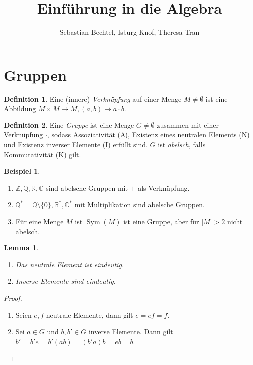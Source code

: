 \documentclass[12pt]{scrartcl} %
\DeclareMathOperator{\sym}{Sym}
\newtheorem{lemma}[thm]{Lemma}
\theoremstyle{definition}
\newtheorem*{defn}{Definition}
\newtheorem{ex}{Beispiel}
\theoremstyle{remark}
\begin{document}
\author{Sebastian Bechtel, Isburg Knof, Theresa Tran} %
\title{Einführung in die Algebra}

\maketitle

\section{Gruppen}

\begin{defn}
	Eine (innere) \emph{Verknüpfung} auf einer Menge $M\neq \emptyset$ ist eine Abbildung $M\times M\to M, (a,b)\mapsto a\cdot b$.
\end{defn}

\begin{defn}
	Eine \emph{Gruppe} ist eine Menge $G\neq \emptyset$ zusammen mit einer Verknüpfung $\cdot$, sodass Assoziativität (A), Existenz eines neutralen Elements (N) und Existenz inverser Elemente (I) erfüllt sind.
	$G$ ist \emph{abelsch}, falls Kommutativität (K) gilt.
\end{defn}

\begin{ex}
	\begin{enumerate}
	\item $\mathbb{Z}, \mathbb{Q}, \mathbb{R}, \mathbb{C}$ sind abelsche Gruppen mit $+$ als Verknüpfung.
	\item $\mathbb{Q}^*=\mathbb{Q}\setminus \{0\}, \mathbb{R}^*, \mathbb{C}^*$ mit Multiplikation sind abelsche Gruppen.
	\item Für eine Menge $M$ ist $\sym(M)$ ist eine Gruppe, aber für $|M| > 2$ nicht abelsch.
	\end{enumerate}
\end{ex}

\begin{lemma}
	\begin{enumerate}[label=\alph*)]
	\item Das neutrale Element ist eindeutig.
	\item Inverse Elemente sind eindeutig.
	\end{enumerate}
\end{lemma}

\begin{proof}
	\begin{enumerate}[label=\alph*)]
	\item Seien $e,f$ neutrale Elemente, dann gilt $e=ef=f$.
	\item Sei $a\in G$ und $b,b'\in G$ inverse Elemente. Dann gilt $b'=b'e=b'(ab)=(b'a)b=eb=b$.
	\end{enumerate}
\end{proof}
\end{document}
